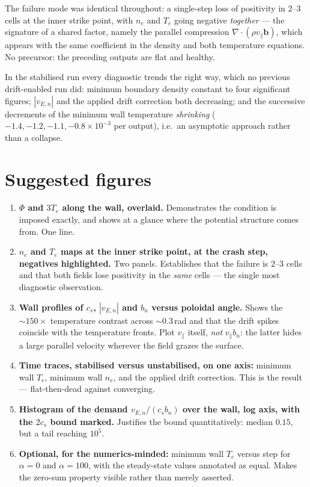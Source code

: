 \documentclass[11pt,a4paper]{article}
\newcommand{\vpar}{v_\parallel}
\newcommand{\cs}{c_s}
\newcommand{\vEn}{v_{E,n}}
\begin{document}
The failure mode was identical throughout: a single-step loss of positivity in $2$--$3$ cells at
the inner strike point, with $n_e$ and $T_e$ going negative \emph{together} --- the signature of a
shared factor, namely the parallel compression $\nabla\!\cdot(\rho\vpar\bm{b})$, which appears with
the same coefficient in the density and both temperature equations. No precursor: the preceding
outputs are flat and healthy.

In the stabilised run every diagnostic trends the right way, which no previous drift-enabled run
did: minimum boundary density constant to four significant figures; $|\vEn|$ and the applied drift
correction both decreasing; and the successive decrements of the minimum wall temperature
\emph{shrinking} ($-1.4,-1.2,-1.1,-0.8\times10^{-3}$ per output), i.e.\ an asymptotic approach
rather than a collapse.

\section{Suggested figures}

\begin{enumerate}\itemsep3pt
\item \textbf{$\Phi$ and $3T_e$ along the wall, overlaid.} Demonstrates the condition is imposed
exactly, and shows at a glance where the potential structure comes from. One line.
\item \textbf{$n_e$ and $T_e$ maps at the inner strike point, at the crash step, negatives
highlighted.} Two panels. Establishes that the failure is $2$--$3$ cells and that both fields lose
positivity in the \emph{same} cells --- the single most diagnostic observation.
\item \textbf{Wall profiles of $\cs$, $|\vEn|$ and $b_n$ versus poloidal angle.} Shows the
$\sim\!150\times$ temperature contrast across $\sim\!0.3$\,rad and that the drift spikes coincide
with the temperature fronts. Plot $\vpar$ itself, \emph{not} $\vpar b_n$: the latter hides a large
parallel velocity wherever the field grazes the surface.
\item \textbf{Time traces, stabilised versus unstabilised, on one axis:} minimum wall $T_e$,
minimum wall $n_e$, and the applied drift correction. This is the result --- flat-then-dead against
converging.
\item \textbf{Histogram of the demand $\vEn/(\cs b_n)$ over the wall, log axis, with the $2\cs$
bound marked.} Justifies the bound quantitatively: median $0.15$, but a tail reaching $10^5$.
\item \textbf{Optional, for the numerics-minded:} minimum wall $T_e$ versus step for
$\alpha=0$ and $\alpha=100$, with the steady-state values annotated as equal. Makes the zero-sum
property visible rather than merely asserted.
\end{enumerate}
\end{document}
